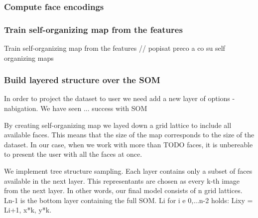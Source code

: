 \subsubsection*{Compute face encodings}


\subsubsection*{Train self-organizing map from the features}
Train self-organizing map from the features
// popisat preco a co su self organizing maps



\subsubsection*{Build layered structure over the SOM}

In order to project the dataset to user we need add a new layer of options - nabigation. We have seen ... success with SOM 

By creating self-organizing map we layed down a grid lattice to include all available faces. This means that the size of the map corresponds to the size of the dataset. In our case, when we work with more than TODO faces, it is unbereable to present the user with all the faces at once.

We implement tree structure sampling. Each layer contains only a subset of faces available in the next layer. This representants are chosen as every k-th image from the next layer. In other words, our final model consists of n grid lattices. Ln-1 is the bottom layer containing the full SOM. Li for i e {0,...n-2} holds: Lixy = Li+1, x*k, y*k.
